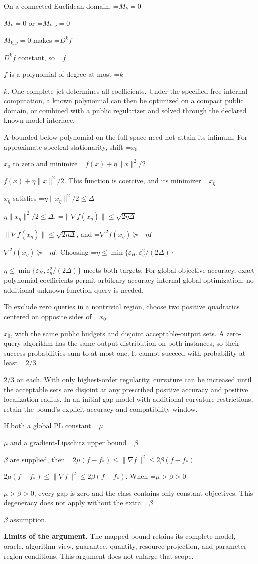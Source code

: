 \documentclass[10pt,a4paper]{article}
\newcommand{\AtlasMath}[1]{\par\begingroup\centering\setbox0=\hbox{$\displaystyle #1$}\ifdim\wd0>1.4\linewidth\typeout{ATLAS WIDE FORMULA: \the\wd0}\fi\ifdim\wd0>\linewidth\resizebox{\linewidth}{!}{\box0}\else\box0\fi\par\endgroup}
\newcommand{\AtlasInlineMath}[1]{\begingroup\setbox0=\hbox{$#1$}\ifdim\wd0>.4\linewidth\endgroup\AtlasMath{#1}\else\endgroup$#1$\fi}
\begin{document}
On a connected Euclidean domain, \AtlasInlineMath{M_k=0} or \AtlasInlineMath{M_{k,\nu}=0} makes \AtlasInlineMath{D^kf} constant, so \AtlasInlineMath{f} is a polynomial of degree at most \AtlasInlineMath{k}. One complete jet determines all coefficients. Under the specified free internal computation, a known polynomial can then be optimized on a compact public domain, or combined with a public regularizer and solved through the declared known-model interface.

A bounded-below polynomial on the full space need not attain its infimum. For approximate spectral stationarity, shift \AtlasInlineMath{x_0} to zero and minimize \AtlasInlineMath{f(x)+\eta\|x\|^2/2}. This function is coercive, and its minimizer \AtlasInlineMath{x_\eta} satisfies \AtlasInlineMath{\eta\|x_\eta\|^2/2\le\Delta}, \AtlasInlineMath{\|\nabla f(x_\eta)\|\le\sqrt{2\eta\Delta}}, and \AtlasInlineMath{\nabla^2f(x_\eta)\succeq-\eta I}. Choosing \AtlasInlineMath{\eta\le\min\{\varepsilon_H,\varepsilon_g^2/(2\Delta)\}} meets both targets. For global objective accuracy, exact polynomial coefficients permit arbitrary-accuracy internal global optimization; no additional unknown-function query is needed.

To exclude zero queries in a nontrivial region, choose two positive quadratics centered on opposite sides of \AtlasInlineMath{x_0}, with the same public budgets and disjoint acceptable-output sets. A zero-query algorithm has the same output distribution on both instances, so their success probabilities sum to at most one. It cannot succeed with probability at least \AtlasInlineMath{2/3} on each. With only highest-order regularity, curvature can be increased until the acceptable sets are disjoint at any prescribed positive accuracy and positive localization radius. In an initial-gap model with additional curvature restrictions, retain the bound's explicit accuracy and compatibility window.

If both a global PL constant \AtlasInlineMath{\mu} and a gradient-Lipschitz upper bound \AtlasInlineMath{\beta} are supplied, then \AtlasInlineMath{2\mu(f-f_*)\le\|\nabla f\|^2\le2\beta(f-f_*)}. When \AtlasInlineMath{\mu>\beta>0}, every gap is zero and the class contains only constant objectives. This degeneracy does not apply without the extra \AtlasInlineMath{\beta} assumption.

\textbf{Limits of the argument.} The mapped bound retains its complete model, oracle, algorithm view, guarantee, quantity, resource projection, and parameter-region conditions. This argument does not enlarge that scope.
\end{document}
